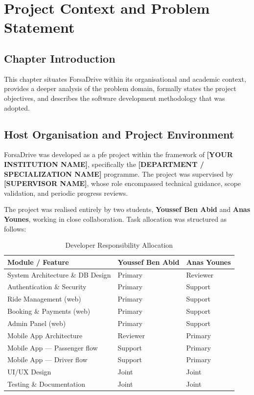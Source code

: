 \documentclass[12pt,a4paper,openright]{report}
\begin{document}
\chapter{Project Context and Problem Statement}

\section*{Chapter Introduction}
This chapter situates ForsaDrive within its organisational and academic context, provides a deeper analysis of the problem domain, formally states the project objectives, and describes the software development methodology that was adopted.

\section{Host Organisation and Project Environment}

ForsaDrive was developed as a \gls{pfe} project within the framework of \textbf{[YOUR INSTITUTION NAME]}, specifically the \textbf{[DEPARTMENT / SPECIALIZATION NAME]} programme. The project was supervised by \textbf{[SUPERVISOR NAME]}, whose role encompassed technical guidance, scope validation, and periodic progress reviews.

The project was realised entirely by two students, \textbf{Youssef Ben Abid} and \textbf{Anas Younes}, working in close collaboration. Task allocation was structured as follows:

\begin{table}[H]
\centering
\caption{Developer Responsibility Allocation}
\label{tab:dev-allocation}
\begin{tabularx}{\textwidth}{l X X}
\toprule
\textbf{Module / Feature} & \textbf{Youssef Ben Abid} & \textbf{Anas Younes} \\
\midrule
System Architecture \& DB Design & Primary & Reviewer \\
Authentication \& Security & Primary & Support \\
Ride Management (web) & Primary & Support \\
Booking \& Payments (web) & Primary & Support \\
Admin Panel (web) & Primary & Support \\
Mobile App Architecture & Reviewer & Primary \\
Mobile App — Passenger flow & Support & Primary \\
Mobile App — Driver flow & Support & Primary \\
UI/UX Design & Joint & Joint \\
Testing \& Documentation & Joint & Joint \\
\bottomrule
\end{tabularx}
\end{table}
\end{document}
